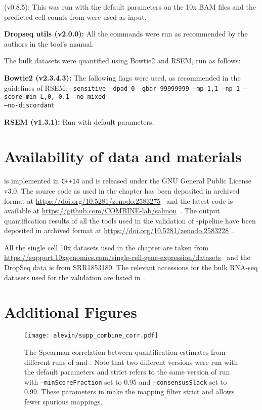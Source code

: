 \dropest (v0.8.5): This was run with the default parameters on the 10x BAM files and the predicted cell counts from \cellr were used as input.

\textbf{Dropseq utils (v2.0.0):} All the commands were run as recommended by the authors in the tool's manual.

The bulk datasets were quantified using Bowtie2 and RSEM, run as follows:

\textbf{Bowtie2 (v2.3.4.3):} The following flags were used, as recommended in the guidelines of RSEM: \texttt{--sensitive --dpad 0 --gbar 99999999 --mp 1,1 --np 1 --score-min L,0,-0.1 --no-mixed \\ --no-discordant}

\textbf{RSEM (v1.3.1):} Run with default parameters.



\section{Availability of data and materials}
\Alevin is implemented in \texttt{C++14} and is released under the GNU General Public License v3.0. The source code as used in the chapter has been deposited in archived format at \url{https://doi.org/10.5281/zenodo.2583275}~\citep{scode} and the latest code is available at \url{https://github.com/COMBINE-lab/salmon}~\citep{alvgit}. The output quantification results of all the tools used in the validation of \alevin-pipeline have been deposited in archived format at \url{https://doi.org/10.5281/zenodo.2583228}~\citep{vdata}.

All the single cell 10x datasets used in the chapter are taken from \url{https://support.10xgenomics.com/single-cell-gene-expression/datasets}~\citep{v2data} and the DropSeq data is from SRR1853180. The relevant accessions for the bulk RNA-seq datasets used for the validation are listed in~.

\newpage
\section{Additional Figures}
\begin{figure*}[!htb]
    \centering
  \texttt{[image: alevin/supp\_combine\_corr.pdf]}
  \caption{The Spearman correlation between quantification estimates from different runs of \alevin and \cellr. Note that two different versions \cellr were run with the default parameters and \alevin strict refers to the same version of \alevin run with \texttt{--minScoreFraction} set to 0.95 and \texttt{--consensusSlack} set to 0.99. These parameters in \alevin make the mapping filter strict and allows fewer spurious mappings.}
  \label{suppfig1}
\end{figure*}

